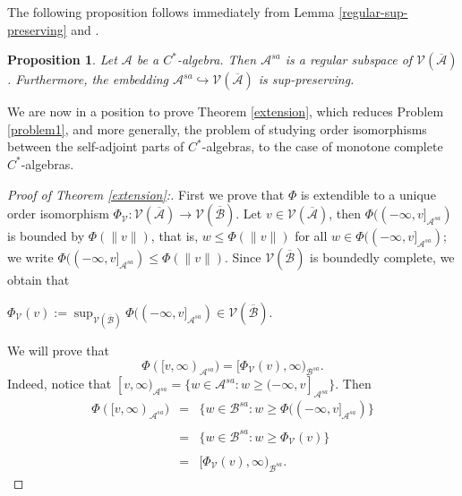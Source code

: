 \documentclass[12pt]{amsart}
\newtheorem{prop}[thm]{Proposition}
\theoremstyle{definition}
\theoremstyle{remark}
\numberwithin{equation}{section}
\begin{document}
The following proposition  follows  immediately from Lemma \ref{regular-sup-preserving} and \cite[Lemma 2.5]{Hamana}.
\begin{prop}\label{A-regular}
	Let $\mathcal{A}$	be a $C^*$-algebra. Then  $\mathcal{A}^{sa}$ is  a regular  subspace of $ \mathcal{V}(\overline{\mathcal{A}})$. Furthermore, the embedding $\mathcal{A}^{sa} \hookrightarrow \mathcal{V}(\overline{\mathcal{A}})$ is sup-preserving.
\end{prop}

We are now in a position to prove Theorem \ref{extension}, which reduces Problem \ref{problem1}, and more generally, the problem of studying order isomorphisms between the self-adjoint parts of $C^*$-algebras, to the case of monotone complete $C^*$-algebras.


\begin{proof}[Proof of Theorem \ref{extension}:]
	First we prove that $\Phi$ is extendible to a unique order isomorphism $\Phi_\mathcal{V}:\mathcal{V}(\overline{\mathcal{A}})\to \mathcal{V}(\overline{\mathcal{B}})$. Let $v\in\mathcal{V}(\overline{\mathcal{A}})$, then $\Phi((-\infty,v]_{\mathcal{A}^{sa}})$ is bounded by  $\Phi(\|v\|)$, that is, $w\leq\Phi(\|v\|)$ for all $w\in \Phi((-\infty,v]_{\mathcal{A}^{sa}})$; we write $\Phi((-\infty,v]_{\mathcal{A}^{sa}})\leq \Phi(\|v\|)$. Since $\mathcal{V}(\overline{\mathcal{B}})$ is boundedly complete, we obtain that \begin{center}
		$\Phi_\mathcal{V}(v):=\sup_{\mathcal{V}(\overline{\mathcal{B}})}\Phi((-\infty,v]_{\mathcal{A}^{sa}})\in \mathcal{V}(\overline{\mathcal{B}})$.
	\end{center} 


We will prove that  \begin{equation}\label{i}
		\Phi([v,\infty)_{\mathcal{A}^{sa}})=[\Phi_\mathcal{V}(v),\infty)_{\mathcal{B}^{sa}}.   
	\end{equation}
	Indeed, notice that $[v,\infty)_{\mathcal{A}^{sa}}= \{w\in \mathcal{A}^{sa}: w\geq (-\infty,v]_{\mathcal{A}^{sa}}\}$.  Then $$\begin{array}{lllll}
		\Phi([v,\infty)_{\mathcal{A}^{sa}})&=&  \{w\in \mathcal{B}^{sa}: w\geq \Phi((-\infty,v]_{\mathcal{A}^{sa}})\}\\ \\
		&=& \{w\in \mathcal{B}^{sa}: w\geq \Phi_\mathcal{V}(v)\}\\ \\ 
		&=& [\Phi_\mathcal{V}(v),\infty)_{\mathcal{B}^{sa}}.
	\end{array}
	$$
	

\end{proof}
\end{document}
